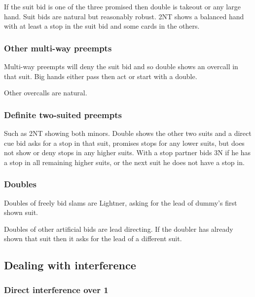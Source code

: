 \documentclass[a4paper,14pt]{extarticle}
\begin{document}
If the suit bid is one of the three promised then double is takeout or any large hand.
Suit bids are natural but reasonably robust. 2NT shows a balanced hand with at 
least a stop in the suit bid and some cards in the others.

\subsubsection{Other multi-way preempts}

Multi-way preempts will deny the suit bid and so double shows an overcall in
that suit. Big hands either pass then act or start with a double.

Other overcalls are natural.

\subsubsection{Definite two-suited preempts}

Such as 2NT showing both minors. Double shows the other two suits and a direct
cue bid asks for a stop in that suit, promises stops for any lower suits, but
does not show or deny stops in any higher suits. With a stop partner bids 3N if
he has a stop in all remaining higher suits, or the next suit he does not have
a stop in.

\subsubsection{Doubles}
\label{sec:def:doubles}

Doubles of freely bid slams are Lightner, asking for the lead of dummy's first shown suit.

Doubles of other artificial bids are lead directing. If the doubler has already shown that
suit then it asks for the lead of a different suit.

\newpage

\subsection{Dealing with interference}
\label{sec:interference}

\subsubsection{Direct interference over 1\clubs}
\label{sec:intf:1c}
\end{document}
